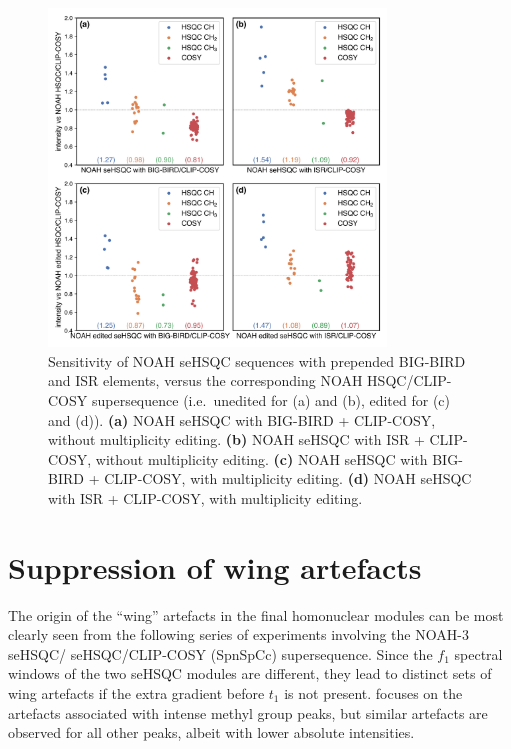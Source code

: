\begin{figure}
    \centering
    \includegraphics[width=0.8\textwidth]{./figures/bigbird.png}
    \caption{
        Sensitivity of NOAH seHSQC sequences with prepended BIG-BIRD and ISR elements, versus the corresponding NOAH HSQC/CLIP-COSY supersequence (i.e.\ unedited for (a) and (b), edited for (c) and (d)).
        \textbf{(a)} NOAH seHSQC with BIG-BIRD + CLIP-COSY, without multiplicity editing.
        \textbf{(b)} NOAH seHSQC with ISR + CLIP-COSY, without multiplicity editing.
        \textbf{(c)} NOAH seHSQC with BIG-BIRD + CLIP-COSY, with multiplicity editing.
        \textbf{(d)} NOAH seHSQC with ISR + CLIP-COSY, with multiplicity editing.
        \andro{}
    }
    \label{fig:bigbird}
\end{figure}


\section{Suppression of wing artefacts}

The origin of the ``wing'' artefacts in the final homonuclear modules can be most clearly seen from the following series of experiments involving the NOAH-3 \nitrogen{} seHSQC/\carbon{} seHSQC/CLIP-COSY (SpnSpCc) supersequence.
Since the $f_1$ spectral windows of the two seHSQC modules are different, they lead to distinct sets of wing artefacts if the extra gradient before $t_1$ is not present.
 focuses on the artefacts associated with intense methyl group peaks, but similar artefacts are observed for all other peaks, albeit with lower absolute intensities.

